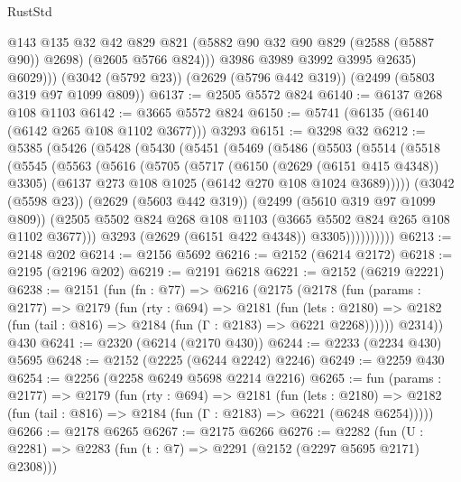 \begin{lexlean}{RustStd}
\begin{coremodule}
                @143
                @135
                @32
                @42
                @829
                @821
                (@5882 @90 @32 @90 @829 (@2588 (@5887 @90)) @2698)
                (@2605 @5766 @824)))
            @3986
            @3989
            @3992
            @3995
            @2635)
          @6029)))
    (@3042 (@5792 @23))
    (@2629 (@5796 @442 @319))
    (@2499 (@5803 @319 @97 @1099 @809))
@6137 := @2505 @5572 @824
@6140 := @6137 @268 @108 @1103
@6142 := @3665 @5572 @824
@6150 := @5741 (@6135 (@6140 (@6142 @265 @108 @1102 @3677))) @3293
@6151 := @3298 @32
@6212 := @5385
    (@5426
      (@5428
        (@5430
          (@5451
            (@5469
              (@5486
                (@5503
                  (@5514
                    (@5518
                      (@5545
                        (@5563
                          (@5616
                            (@5705
                              (@5717
                                (@6150 (@2629 (@6151 @415 @4348)) @3305)
                                (@6137 @273 @108 @1025 (@6142 @270 @108 @1024 @3689)))))
                          (@3042 (@5598 @23))
                          (@2629 (@5603 @442 @319))
                          (@2499 (@5610 @319 @97 @1099 @809))
                          (@2505
                            @5502
                            @824
                            @268
                            @108
                            @1103
                            (@3665 @5502 @824 @265 @108 @1102 @3677)))
                        @3293
                        (@2629 (@6151 @422 @4348))
                        @3305))))))))))
@6213 := @2148 @202
@6214 := @2156 @5692
@6216 := @2152 (@6214 @2172)
@6218 := @2195 (@2196 @202)
@6219 := @2191 @6218
@6221 := @2152 (@6219 @2221)
@6238 := @2151
    (fun (fn : @77) =>
    @6216
      (@2175
        (@2178
          (fun (params : @2177) =>
          @2179
            (fun (rty : @694) =>
            @2181
              (fun (lets : @2180) =>
              @2182 (fun (tail : @816) => @2184 (fun (Γ : @2183) => @6221 @2268))))))
        @2314))
    @430
@6241 := @2320 (@6214 (@2170 @430))
@6244 := @2233 (@2234 @430) @5695
@6248 := @2152 (@2225 (@6244 @2242) @2246)
@6249 := @2259 @430
@6254 := @2256 (@2258 @6249 @5698 @2214 @2216)
@6265 := fun (params : @2177) =>
  @2179
    (fun (rty : @694) =>
    @2181
      (fun (lets : @2180) =>
      @2182 (fun (tail : @816) => @2184 (fun (Γ : @2183) => @6221 (@6248 @6254)))))
@6266 := @2178 @6265
@6267 := @2175 @6266
@6276 := @2282 (fun (U : @2281) => @2283 (fun (t : @7) => @2291 (@2152 (@2297 @5695 @2171) @2308)))

\end{coremodule}
\end{lexlean}
